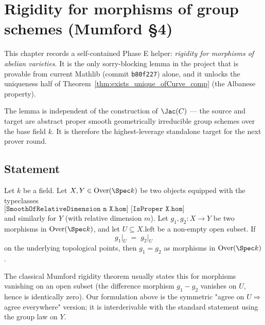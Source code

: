 \chapter{Rigidity for morphisms of group schemes (Mumford §4)}
\label{chap:Rigidity}

This chapter records a self-contained Phase E helper: \emph{rigidity for morphisms of abelian varieties}. It is the only sorry-blocking lemma in the project that is provable from current Mathlib (commit \texttt{b80f227}) alone, and it unlocks the uniqueness half of Theorem~\ref{thm:exists_unique_ofCurve_comp} (the Albanese property).

The lemma is independent of the construction of $\Jac(C)$ — the source and target are abstract proper smooth geometrically irreducible group schemes over the base field $k$. It is therefore the highest-leverage standalone target for the next prover round.

\section{Statement}

\begin{theorem}
  \label{thm:GrpObj_eq_of_eqOnOpen}
  \leanok
  Let $k$ be a field. Let $X, Y \in \textrm{Over}(\Spec k)$ be two objects equipped with the typeclasses
  \[
    \texttt{[SmoothOfRelativeDimension n X.hom] [IsProper X.hom] [GeometricallyIrreducible X.hom] [GrpObj X]}
  \]
  and similarly for $Y$ (with relative dimension $m$). Let $g_1, g_2 \colon X \to Y$ be two morphisms in $\textrm{Over}(\Spec k)$, and let $U \subseteq X.\mathrm{left}$ be a non-empty open subset. If
  \[
    g_1\big|_U \;=\; g_2\big|_U
  \]
  on the underlying topological points, then $g_1 = g_2$ as morphisms in $\textrm{Over}(\Spec k)$.
\end{theorem}

\begin{remark}
  The classical Mumford rigidity theorem usually states this for morphisms vanishing on an open subset (the difference morphism $g_1 - g_2$ vanishes on $U$, hence is identically zero). Our formulation above is the symmetric "agree on $U \Rightarrow$ agree everywhere" version; it is interderivable with the standard statement using the group law on $Y$.
\end{remark}

